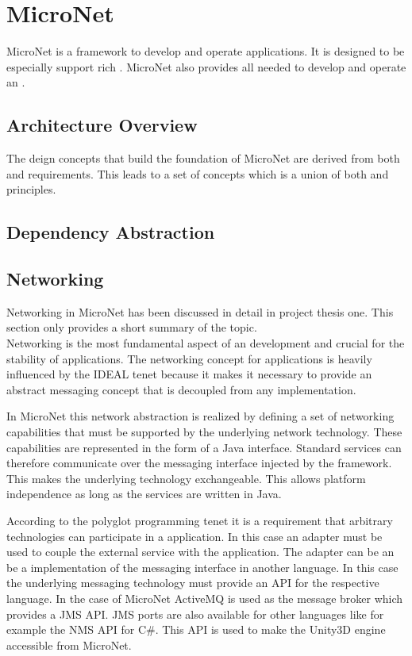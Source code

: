 \section{MicroNet}

MicroNet is a framework to develop and operate \ms{} applications. It is
designed to be especially support rich \ogs{}. MicroNet also provides all
needed to develop and operate an \og{}.

\subsection{Architecture Overview}

The deign concepts that build the foundation of MicroNet are derived from both
\ms{} and \og{} requirements. This leads to a set of concepts which is a union
of both \ms{} and \og{} principles.

\subsection{Dependency Abstraction}

\subsection{Networking}
Networking in MicroNet has been discussed in detail in project thesis one. This
section only provides a short summary of the topic.\\

Networking is the most fundamental aspect of an \og{} development and crucial
for the stability of \ms{} applications. The networking concept for \ms{}
applications is heavily influenced by the IDEAL tenet because it makes it
necessary to provide an abstract messaging concept that is decoupled from any
implementation.

In MicroNet this network abstraction is realized by defining a set of networking
capabilities that must be supported by the underlying network technology. These
capabilities are represented in the form of a Java interface. Standard services
can therefore communicate over the messaging interface injected by the
framework. This makes the underlying technology exchangeable. This allows
platform independence as long as the services are written in Java.

According to the polyglot programming tenet it is a requirement that arbitrary
technologies can participate in a \ms{} application. In this case an adapter
must be used to couple the external service with the application. The adapter
can be an be a implementation of the messaging interface in another language. In
this case the underlying messaging technology must provide an API for the
respective language. In the case of MicroNet ActiveMQ is used as the
message broker which provides a JMS API. JMS ports are also available for other
languages like for example the NMS API for C\#. This API is used to make the
Unity3D engine accessible from MicroNet.

